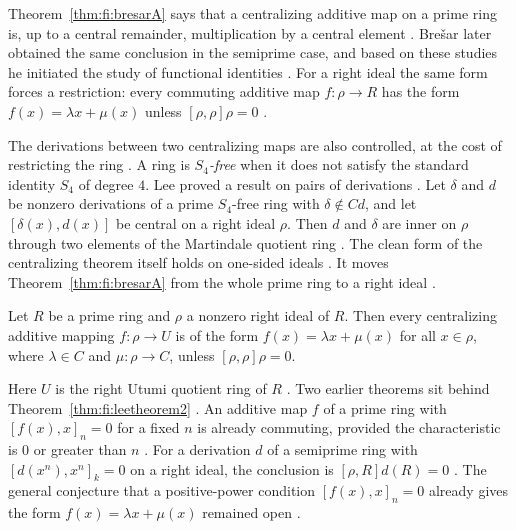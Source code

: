 Theorem~\ref{thm:fi:bresarA} says that a centralizing additive map on a
prime ring is, up to a central remainder, multiplication by a central
element \cite[p.~385]{Bresar1993}. Bre\v{s}ar later obtained the same
conclusion in the semiprime case, and based on these studies he initiated
the study of functional identities \cite[p.~333]{LeeTK1997Centralizing}.
For a right ideal the same form forces a restriction: every commuting
additive map $f\colon\rho\to R$ has the form $f(x)=\lambda x+\mu(x)$
unless $[\rho,\rho]\rho=0$ \cite[p.~333]{LeeTK1997Centralizing}.

The derivations between two centralizing maps are also controlled, at the
cost of restricting the ring \cite[p.~334]{LeeTK1997Centralizing}. A ring
is \emph{$S_4$-free} when it does not
satisfy the standard identity $S_4$ of degree $4$. Lee proved a result on
pairs of derivations \cite[Theorem~1, p.~334]{LeeTK1997Centralizing}.
Let $\delta$ and $d$ be nonzero derivations of a prime $S_4$-free ring with
$\delta\notin Cd$, and let $[\delta(x),d(x)]$ be central on a right ideal
$\rho$. Then $d$ and $\delta$ are inner on $\rho$ through two elements of
the Martindale quotient ring
\cite[Theorem~1, p.~334]{LeeTK1997Centralizing}.
The clean form of the centralizing theorem itself holds on one-sided
ideals \cite[Theorem~2, p.~334]{LeeTK1997Centralizing}. It moves
Theorem~\ref{thm:fi:bresarA} from the whole prime ring to a right ideal
\cite[p.~335]{LeeTK1997Centralizing}.

\begin{theorem}\label{thm:fi:leetheorem2}
Let $R$ be a prime ring and $\rho$ a nonzero right ideal of $R$. Then
every centralizing additive mapping $f\colon\rho\to U$ is of the form
$f(x)=\lambda x+\mu(x)$ for all $x\in\rho$, where $\lambda\in C$ and
$\mu\colon\rho\to C$, unless $[\rho,\rho]\rho=0$.
\end{theorem}

Here $U$ is the right Utumi quotient ring of $R$
\cite[p.~334]{LeeTK1997Centralizing}. Two earlier theorems sit behind
Theorem~\ref{thm:fi:leetheorem2} \cite[p.~334]{LeeTK1997Centralizing}.
An additive map $f$ of a prime ring with $[f(x),x]_n=0$ for a
fixed $n$ is already commuting, provided the characteristic is $0$ or
greater than $n$ \cite[Theorem~B, p.~334]{LeeTK1997Centralizing}. For a
derivation $d$ of a semiprime ring with $[d(x^n),x^n]_k=0$ on a right
ideal, the conclusion is $[\rho,R]d(R)=0$
\cite[Theorem~L, p.~334]{LeeTK1997Centralizing}. The general conjecture
that a positive-power condition $[f(x),x]_n=0$ already gives the form
$f(x)=\lambda x+\mu(x)$ remained open
\cite[p.~334]{LeeTK1997Centralizing}.

